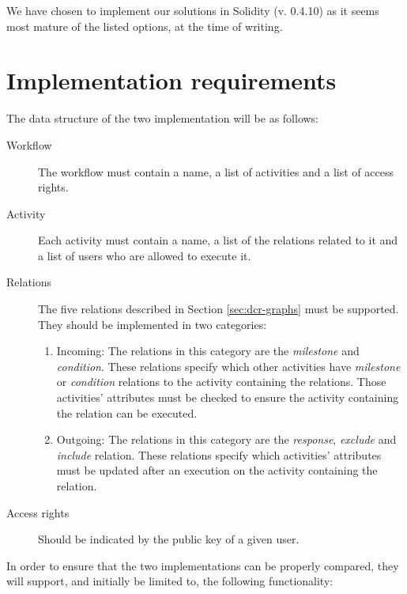 \documentclass{article}
\begin{document}
		We have chosen to implement our solutions in Solidity (v. 0.4.10) as it seems most mature of the listed options, at the time of writing.

	\section{Implementation requirements}
	\label{sec:implementation-requirements}
	The data structure of the two implementation will be as follows:

	\begin{description}
		\item[Workflow] The workflow must contain a name, a list of activities and a list of access rights.
		\item[Activity] Each activity must contain a name, a list of the relations related to it and a list of users who are allowed to execute it.
		\item[Relations] The five relations described in Section \ref{sec:dcr-graphs} must be supported. They should be implemented in two categories:
			\begin{enumerate}
				\item Incoming: The relations in this category are the \emph{milestone} and \emph{condition}. These relations specify which other activities have \emph{milestone} or \emph{condition} relations to the activity containing the relations. Those activities' attributes must be checked to ensure the activity containing the relation can be executed.
				\item Outgoing: The relations in this category are the \emph{response}, \emph{exclude} and \emph{include} relation. These relations specify which activities' attributes must be updated after an execution on the activity containing the relation. 
			\end{enumerate}
		\item[Access rights] Should be indicated by the public key of a given user.
	\end{description}

	In order to ensure that the two implementations can be properly compared, they will support, and initially be limited to, the following functionality: 
	
\end{document}
